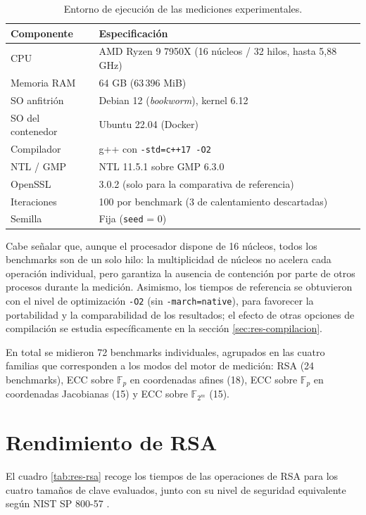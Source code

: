 \begin{table}[htbp]
\centering
\begin{tabular}{ll}
\hline
\textbf{Componente} & \textbf{Especificación} \\
\hline
CPU              & AMD Ryzen 9 7950X (16 núcleos / 32 hilos, hasta 5,88 GHz) \\
Memoria RAM      & 64 GB (63\,396 MiB) \\
SO anfitrión     & Debian 12 (\textit{bookworm}), kernel 6.12 \\
SO del contenedor & Ubuntu 22.04 (Docker) \\
Compilador       & g++ con \texttt{-std=c++17 -O2} \\
NTL / GMP        & NTL 11.5.1 sobre GMP 6.3.0 \\
OpenSSL          & 3.0.2 (solo para la comparativa de referencia) \\
Iteraciones      & 100 por benchmark (3 de calentamiento descartadas) \\
Semilla          & Fija (\texttt{seed} = 0) \\
\hline
\end{tabular}
\caption{Entorno de ejecución de las mediciones experimentales.}
\label{tab:res-hardware}
\end{table}

Cabe señalar que, aunque el procesador dispone de 16 núcleos, todos los benchmarks son de un solo hilo: la multiplicidad de núcleos no acelera cada operación individual, pero garantiza la 
ausencia de contención por parte de otros procesos durante la medición. Asimismo, los tiempos de referencia se obtuvieron con el nivel de optimización \texttt{-O2} (sin \texttt{-march=native}), 
para favorecer la portabilidad y la comparabilidad de los resultados; el efecto de otras opciones de compilación se estudia específicamente en la sección \ref{sec:res-compilacion}.

En total se midieron 72 benchmarks individuales, agrupados en las cuatro familias que corresponden a los modos del motor de medición: RSA (24 benchmarks), ECC sobre $\mathbb{F}_p$ en 
coordenadas afines (18), ECC sobre $\mathbb{F}_p$ en coordenadas Jacobianas (15) y ECC sobre $\mathbb{F}_{2^m}$ (15).

\section{Rendimiento de RSA}
\label{sec:res-rsa}

El cuadro \ref{tab:res-rsa} recoge los tiempos de las operaciones de RSA para los cuatro tamaños de clave evaluados, junto con su nivel de seguridad equivalente según 
NIST SP 800-57 \cite{nist-sp800-57}.


